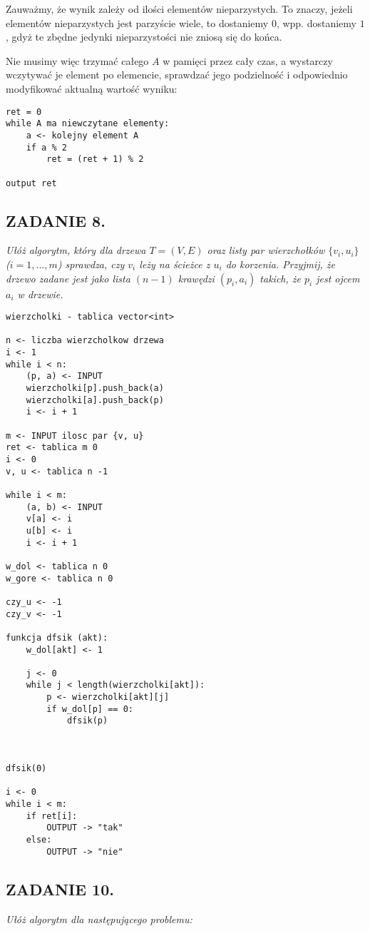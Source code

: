 \documentclass{article}
\begin{document}
Zauważmy, że wynik zależy od ilości elementów nieparzystych. To znaczy, jeżeli elementów nieparzystych jest parzyście wiele, to dostaniemy $0$, wpp. dostaniemy $1$, gdyż te zbędne jedynki nieparzystości nie zniosą się do końca.

Nie musimy więc trzymać całego $A$ w pamięci przez cały czas, a wystarczy wczytywać je element po elemencie, sprawdzać jego podzielność i odpowiednio modyfikować aktualną wartość wyniku:
\begin{lstlisting}
ret = 0
while A ma niewczytane elementy:
    a <- kolejny element A
    if a % 2
        ret = (ret + 1) % 2
    
output ret
\end{lstlisting}

\subsection*{ZADANIE 8.}
\emph{Ułóż algorytm, który dla drzewa $T=(V, E)$ oraz listy par wierzchołków $\{v_i,u_i\}$ ($i=1,...,m$) sprawdza, czy $v_i$ leży na ścieżce z $u_i$ do korzenia. Przyjmij, że drzewo zadane jest jako lista $(n-1)$ krawędzi $(p_i,a_i)$ takich, że $p_i$ jest ojcem $a_i$ w drzewie.}

\begin{lstlisting}
wierzcholki - tablica vector<int>

n <- liczba wierzcholkow drzewa
i <- 1
while i < n:
    (p, a) <- INPUT
    wierzcholki[p].push_back(a)
    wierzcholki[a].push_back(p)
    i <- i + 1

m <- INPUT ilosc par {v, u}
ret <- tablica m 0
i <- 0
v, u <- tablica n -1

while i < m:
    (a, b) <- INPUT
    v[a] <- i
    u[b] <- i
    i <- i + 1

w_dol <- tablica n 0
w_gore <- tablica n 0

czy_u <- -1
czy_v <- -1

funkcja dfsik (akt):
    w_dol[akt] <- 1

    j <- 0
    while j < length(wierzcholki[akt]):
        p <- wierzcholki[akt][j]
        if w_dol[p] == 0:
            dfsik(p)
        
    

dfsik(0)

i <- 0
while i < m:
    if ret[i]:
        OUTPUT -> "tak"
    else:
        OUTPUT -> "nie"

\end{lstlisting}

\subsection*{ZADANIE 10.}
\emph{Ułóż algorytm dla następującego problemu:}
\end{document}

